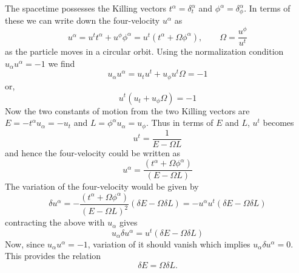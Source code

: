 \documentclass{article}
\begin{document}
\begin{enumerate}
   The spacetime possesses the Killing vectors $t^\alpha = \delta^\alpha_t$ and $\phi^\alpha = \delta^\alpha_\phi$. In terms of these we can write down the four-velocity $u^\alpha$ as
  \begin{equation}
    \label{eq:four-velocity}
    u^\alpha = u^t t^\alpha + u^\phi \phi^\alpha = u^t(t^\alpha + \Omega \phi^\alpha),\qquad \Omega = \frac{u^\phi}{u^t}
  \end{equation}
  as the particle moves in a circular orbit. Using the normalization condition $u_\alpha u^\alpha = -1$ we find
  \begin{equation}
    \label{eq:normalization-condition}
    u_\alpha u^\alpha = u_tu^t + u_\phi u^t\Omega = -1
  \end{equation}
  or,
  \begin{equation}
    \label{eq:normalization-condition-2}
    u^t(u_t + u_\phi \Omega) = -1
  \end{equation}
  Now the two constants of motion from the two Killing vectors are $E = - t^\alpha u_\alpha = -u_t$ and $L = \phi^\alpha u_\alpha = u_\phi$. Thus in terms of $E$ and $L$, $u^t$ becomes
  \begin{equation}
    \label{eq:u^t}
    u^t = \frac{1}{E - \Omega L}
  \end{equation}
  and hence the four-velocity could be written as
  \begin{equation}
    \label{eq:four-velocity-2}
    u^\alpha = \frac{(t^\alpha + \Omega \phi^\alpha)}{(E -\Omega L)}
  \end{equation}
  The variation of the four-velocity would be given by
  \begin{equation}
    \label{eq:variation-u^alpha}
    \delta u^\alpha = -\frac{(t^\alpha + \Omega \phi^\alpha)}{(E -\Omega L)^2}(\delta E - \Omega \delta L) = - u^\alpha u^t (\delta E - \Omega \delta L)
  \end{equation}
  contracting the above with $u_\alpha$ gives
  \begin{equation}
    \label{eq:u_alpha-delta-u^alpha}
    u_\alpha \delta u^\alpha = u^t(\delta E - \Omega \delta L)
  \end{equation}
  Now, since $u_\alpha u^\alpha = -1$, variation of it should vanish which implies $u_\alpha \delta u^\alpha = 0$. This provides the relation
  \begin{equation}
    \label{eq:deltaE-deltaL}
    \boxed{\delta E = \Omega \delta L}.
  \end{equation}
\end{enumerate}
\end{document}
